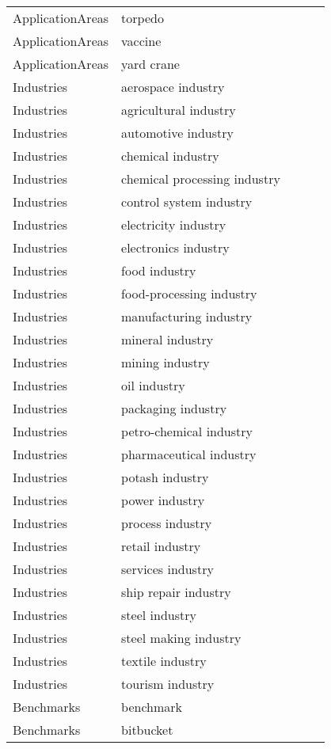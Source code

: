 {\begin{longtable}{lp{3cm}>{\raggedright}p{6cm}>{\raggedright}p{6cm}p{8cm}}
ApplicationAreas & torpedo &  &  & \\
ApplicationAreas & vaccine &  &  & \\
ApplicationAreas & yard crane &  &  & \\
Industries & aerospace industry &  &  & \\
Industries & agricultural industry &  &  & \\
Industries & automotive industry &  &  & \\
Industries & chemical industry &  &  & \\
Industries & chemical processing industry &  &  & \\
Industries & control system industry &  &  & \\
Industries & electricity industry &  &  & \\
Industries & electronics industry &  &  & \\
Industries & food industry &  &  & \\
Industries & food-processing industry &  &  & \\
Industries & manufacturing industry &  &  & \\
Industries & mineral industry &  &  & \\
Industries & mining industry &  &  & \\
Industries & oil industry &  &  & \\
Industries & packaging industry &  &  & \\
Industries & petro-chemical industry &  &  & \\
Industries & pharmaceutical industry &  &  & \\
Industries & potash industry &  &  & \\
Industries & power industry &  &  & \\
Industries & process industry &  &  & \\
Industries & retail industry &  &  & \\
Industries & services industry &  &  & \\
Industries & ship repair industry &  &  & \\
Industries & steel industry &  &  & \\
Industries & steel making industry &  &  & \\
Industries & textile industry &  &  & \\
Industries & tourism industry &  &  & \\
Benchmarks & benchmark &  &  & \\
Benchmarks & bitbucket &  &  & \\

\end{longtable}}
